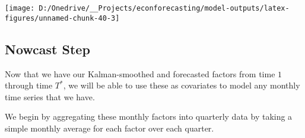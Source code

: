 \documentclass[11pt, letterpaper]{article}\usepackage[]{graphicx}\usepackage[]{color}
\begin{document}
{\centering \texttt{[image: D:/Onedrive/\_\_Projects/econforecasting/model-outputs/latex-figures/unnamed-chunk-40-3]} 

}





\subsection{Nowcast Step}
Now that we have our Kalman-smoothed and forecasted factors from time $1$ through time $T^*$, we will be able to use these as covariates to model any monthly time series that we have.

We begin by aggregating these monthly factors into quarterly data by taking a simple monthly average for each factor over each quarter.
\end{document}
